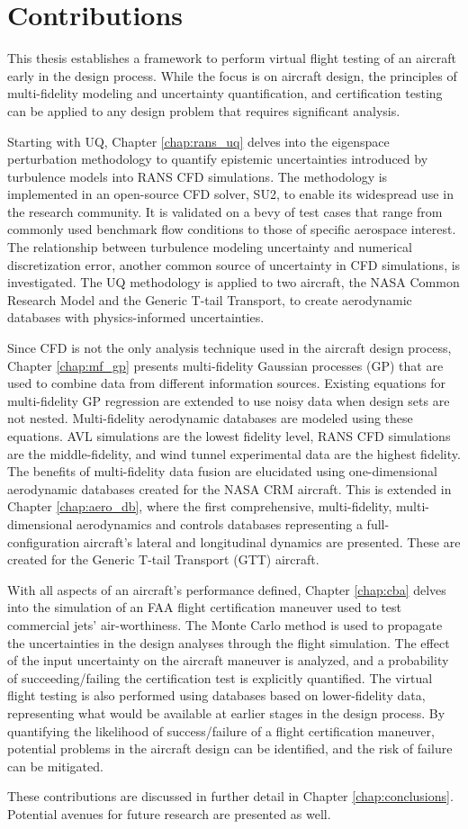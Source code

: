 \section{Contributions} \label{intro_contributions}

This thesis establishes a framework to perform virtual flight testing of an aircraft early in the design process.
While the focus is on aircraft design, the principles of multi-fidelity modeling and uncertainty quantification, and certification testing can be applied to any design problem that requires significant analysis. 

Starting with UQ, Chapter \ref{chap:rans_uq} delves into the eigenspace perturbation methodology to quantify epistemic uncertainties introduced by turbulence models into RANS CFD simulations.
The methodology is implemented in an open-source CFD solver, SU2, to enable its widespread use in the research community. 
It is validated on a bevy of test cases that range from commonly used benchmark flow conditions to those of specific aerospace interest. 
The relationship between turbulence modeling uncertainty and numerical discretization error, another common source of uncertainty in CFD simulations, is investigated.
The UQ methodology is applied to two aircraft, the NASA Common Research Model and the Generic T-tail Transport, to create aerodynamic databases with physics-informed uncertainties. 

Since CFD is not the only analysis technique used in the aircraft design process, Chapter \ref{chap:mf_gp} presents multi-fidelity Gaussian processes (GP) that are used to combine data from different information sources. 
Existing equations for multi-fidelity GP regression are extended to use noisy data when design sets are not nested.
Multi-fidelity aerodynamic databases are modeled using these equations.
AVL simulations are the lowest fidelity level, RANS CFD simulations are the middle-fidelity, and wind tunnel experimental data are the highest fidelity.
The benefits of multi-fidelity data fusion are elucidated using one-dimensional aerodynamic databases created for the NASA CRM aircraft. 
This is extended in Chapter \ref{chap:aero_db}, where the first comprehensive, multi-fidelity, multi-dimensional aerodynamics and controls databases representing a full-configuration aircraft's lateral and longitudinal dynamics are presented. 
These are created for the Generic T-tail Transport (GTT) aircraft.

With all aspects of an aircraft's performance defined, Chapter \ref{chap:cba} delves into the simulation of an FAA flight certification maneuver used to test commercial jets' air-worthiness.
The Monte Carlo method is used to propagate the uncertainties in the design analyses through the flight simulation.
The effect of the input uncertainty on the aircraft maneuver is analyzed, and a probability of succeeding/failing the certification test is explicitly quantified. 
The virtual flight testing is also performed using databases based on lower-fidelity data, representing what would be available at earlier stages in the design process.
By quantifying the likelihood of success/failure of a flight certification maneuver, potential problems in the aircraft design can be identified, and the risk of failure can be mitigated. 

These contributions are discussed in further detail in Chapter \ref{chap:conclusions}.
Potential avenues for future research are presented as well. 
